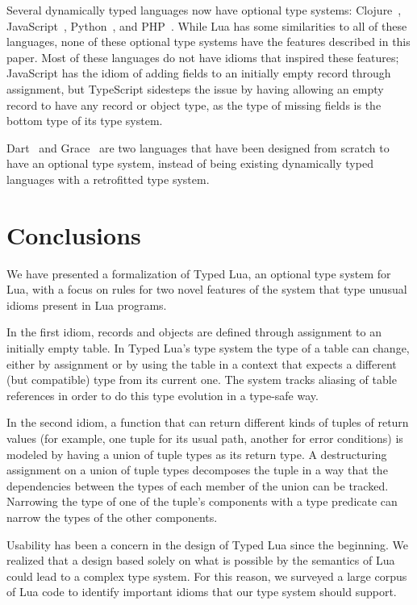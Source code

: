 \documentclass[preprint]{sigplanconf}
\begin{document}
Several dynamically typed languages now have optional
type systems: Clojure~\cite{bonnaire-sergeant2012typed-clojure},
JavaScript~\cite{typescript}, Python~\cite{mypy}, 
and PHP~\cite{hack}. While Lua has some similarities to
all of these languages, none of these optional type
systems have the features described in this paper.
Most of these languages do not have idioms
that inspired these features; JavaScript has the
idiom of adding fields to an initially empty
record through assignment, but TypeScript sidesteps
the issue by having allowing an empty record to
have any record or object type, as the type of
missing fields is the bottom type of its type system.

Dart~\cite{dart} and Grace~\cite{black2013sg} are
two languages that have been designed from scratch
to have an optional type system, instead of being
existing dynamically typed languages with a retrofitted 
type system. 

\section{Conclusions}
\label{sec:conclusion}

We have presented a formalization of Typed Lua,
an optional type system for Lua, with a focus on rules
for two novel features of the system that type unusual
idioms present in Lua programs.

In the first idiom, records and objects are
defined through assignment to an initially empty
table. In Typed Lua's type system the type of a
table can change, either by assignment
or by using the table in a context that expects
a different (but compatible) type from its current one.
The system tracks aliasing of table references
in order to do this type evolution in a type-safe
way.

In the second idiom, a function that can return different
kinds of tuples of return values (for example, one
tuple for its usual path, another for error conditions)
is modeled by having a union of tuple types as its return
type. A destructuring assignment on a union of tuple types
decomposes the tuple in a way that the dependencies between
the types of each member of the union can be tracked.
Narrowing the type of one of the tuple's components with
a type predicate can narrow the types of the other
components.

Usability has been a concern in the design of Typed Lua since the beginning. We realized that a design based solely on what
is possible by the semantics of Lua could lead to a 
complex type system. For this reason, we surveyed a large
corpus of Lua code to identify important idioms that
our type system should support.
\end{document}
